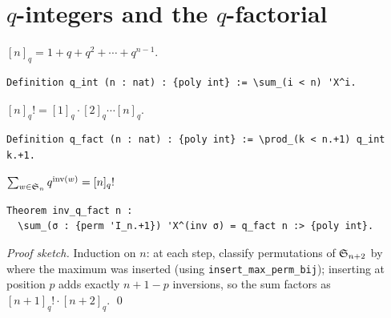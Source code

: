 \section{$q$-integers and the $q$-factorial}

\begin{definition}[$q$-integer]
  $[n]_q = 1 + q + q^2 + \cdots + q^{n-1}$.
\end{definition}

\begin{lstlisting}[language=Rocq]
Definition q_int (n : nat) : {poly int} := \sum_(i < n) 'X^i.
\end{lstlisting}


\begin{definition}[$q$-factorial]
  $[n]_q! = [1]_q \cdot [2]_q \cdots [n]_q$.
\end{definition}

\begin{lstlisting}[language=Rocq]
Definition q_fact (n : nat) : {poly int} := \prod_(k < n.+1) q_int k.+1.
\end{lstlisting}


\begin{theorem}
  $\sum_{w \in \mathfrak{S}_{n}} q^{\mathrm{inv}(w)} = [n]_q!$
\end{theorem}

\begin{lstlisting}[language=Rocq]
Theorem inv_q_fact n :
  \sum_(σ : {perm 'I_n.+1}) 'X^(inv σ) = q_fact n :> {poly int}.
\end{lstlisting}


\noindent
\emph{Proof sketch.} Induction on $n$: at each step, classify
permutations of $\mathfrak{S}_{n+2}$ by where the maximum was inserted (using
\texttt{insert\_max\_perm\_bij}); inserting at position $p$ adds
exactly $n+1 - p$ inversions, so the sum factors as
$[n+1]_q! \cdot [n+2]_q$. \qed

